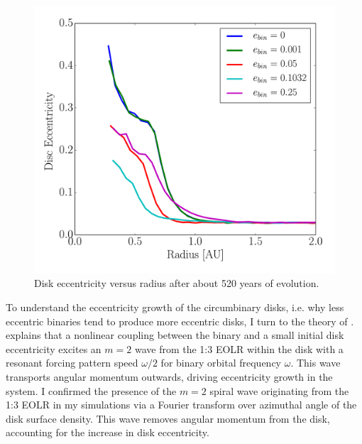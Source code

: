 \begin{figure}
	\includegraphics[width=\columnwidth]{f3}
    \caption{Disk eccentricity versus radius after about 520 years of evolution.}
    \label{fig:CBDiskDiskEccRad}
\end{figure}

To understand the eccentricity growth of the circumbinary disks,
i.e. why less eccentric binaries tend to produce more
eccentric disks, I turn to the theory of \citet{Papaloizou2001}.
\citet{Papaloizou2001} explains that a nonlinear coupling between the
binary and a small initial disk eccentricity excites an $m = 2$ wave
from the 1:3 EOLR within the disk with a resonant forcing pattern
speed $\omega/2$ for binary orbital frequency $\omega$.  This wave
transports angular momentum outwards, driving eccentricity growth in
the system.  I confirmed the presence of the $m = 2$ spiral wave
originating from the 1:3 EOLR in my simulations via a Fourier transform over azimuthal
angle of the disk surface density.  This wave removes angular momentum from the disk, accounting for the increase in disk eccentricity.  

